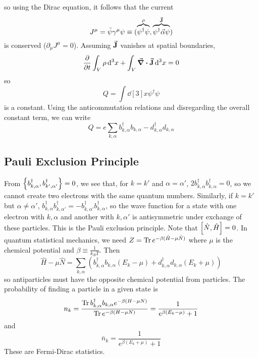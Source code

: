 \documentclass[a4paper,twoside,master.tex]{subfiles}
\begin{document}
so using the Dirac equation, it follows that the current
\begin{equation}
    J^{\mu} = \bar{\psi} \gamma^{\mu} \psi \equiv (\overbrace{\psi^\dagger \psi}^{\rho}, \overbrace{\psi^\dagger \va{\alpha} \psi}^{\va{J}})
\end{equation}
is conserved ($ \partial_{\mu} J^{\mu} = 0 $). Assuming $ \va{J} $ vanishes at spatial boundaries,
\begin{equation}
    \pdv{t} \int_V \rho \dd[3]{x}+ \int_V \div{\va{J}} \dd[3]{x}= 0
\end{equation}
so
\begin{equation}
    Q = \int \dd[3]{x} \psi^\dagger \psi
\end{equation}
is a constant. Using the anticommutation relations and disregarding the overall constant term, we can write
\begin{equation}
    Q = e\sum_{k, \alpha} b^\dagger_{k, \alpha} b_{k, \alpha} - d^\dagger_{k, \alpha} d_{k, \alpha}
\end{equation}

\subsection{Pauli Exclusion Principle}\label{sub:pauli_exclusion_principle}

From $ \pb{b^\dagger_{k, \alpha}}{b^\dagger_{k', \alpha'}} = 0 $, we see that, for $ k = k' $ and $ \alpha = \alpha' $, $ 2 b^\dagger_{k, \alpha} b^\dagger_{k, \alpha} = 0 $, so we cannot create two electrons with the same quantum numbers. Similarly, if $ k = k' $ but $ \alpha \neq \alpha' $, $ b^\dagger_{k, \alpha} b^\dagger_{k, \alpha'} = - b^\dagger_{k, \alpha'} b^\dagger_{k, \alpha} $, so the wave function for a state with one electron with $ k, \alpha $ and another with $ k, \alpha' $ is antisymmetric under exchange of these particles. This is the Pauli exclusion principle. Note that $ \comm{\hat{N}}{\hat{H}} = 0 $. In quantum statistical mechanics, we need $ Z = \Tr e^{- \beta (\hat{H} - \mu \hat{N})} $ where $ \mu $ is the chemical potential and $ \beta \equiv \frac{1}{k_B T} $. Then
\begin{equation}
    \hat{H} - \mu \hat{N} = \sum_{k, \alpha} \left( b^\dagger_{k, \alpha} b_{k, \alpha} (E_k - \mu) + d^\dagger_{k, \alpha} d_{k, \alpha} (E_k + \mu) \right)
\end{equation}
so antiparticles must have the opposite chemical potential from particles. The probability of finding a particle in a given state is
\begin{equation}
    n_k = \frac{\Tr b^\dagger_{k, \alpha} b_{k, \alpha} e^{- \beta (H - \mu N)}}{\Tr e^{- \beta (H - \mu N)}} = \frac{1}{e^{\beta (E_k - \mu)} + 1}
\end{equation}
and
\begin{equation}
    \bar{n}_k = \frac{1}{e^{\beta (E_k + \mu)} + 1}
\end{equation}
These are Fermi-Dirac statistics.
\end{document}
